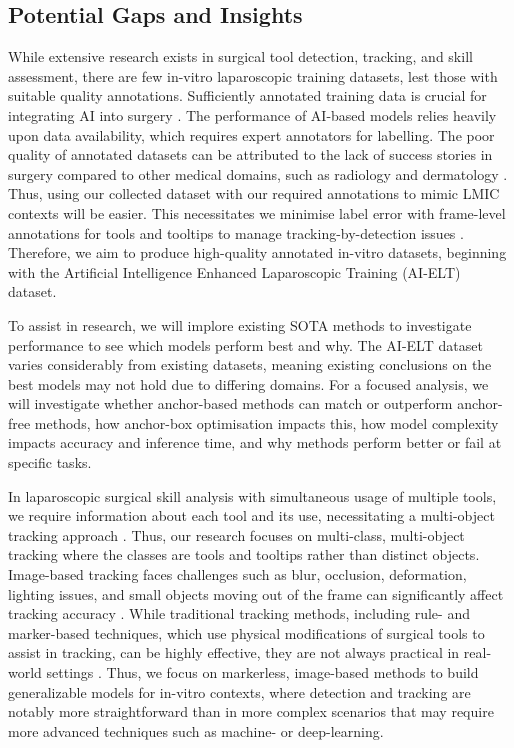 \subsection{Potential Gaps and Insights}

While extensive research exists in surgical tool detection, tracking, and skill assessment, there are few in-vitro laparoscopic training datasets, lest those with suitable quality annotations. Sufficiently annotated training data is crucial for integrating AI into surgery \cite{ali2023comprehensivesurveyrecentdeep}. The performance of AI-based models relies heavily upon data availability, which requires expert annotators for labelling. The poor quality of annotated datasets can be attributed to the lack of success stories in surgery compared to other medical domains, such as radiology and dermatology \cite{maier-hein_surgical_2022}. Thus, using our collected dataset with our required annotations to mimic LMIC contexts will be easier. This necessitates we minimise label error with frame-level annotations for tools and tooltips to manage tracking-by-detection issues \cite{teevno_semi-supervised_2023}. Therefore, we aim to produce high-quality annotated in-vitro datasets, beginning with the Artificial Intelligence Enhanced Laparoscopic Training (AI-ELT) dataset. 

To assist in research, we will implore existing SOTA methods to investigate performance to see which models perform best and why. The AI-ELT dataset varies considerably from existing datasets, meaning existing conclusions on the best models may not hold due to differing domains. For a focused analysis, we will investigate whether anchor-based methods can match or outperform anchor-free methods, how anchor-box optimisation impacts this, how model complexity impacts accuracy and inference time, and why methods perform better or fail at specific tasks. 

In laparoscopic surgical skill analysis with simultaneous usage of multiple tools, we require information about each tool and its use, necessitating a multi-object tracking approach \cite{yang_image-based_2020}. Thus, our research focuses on multi-class, multi-object tracking where the classes are tools and tooltips rather than distinct objects. Image-based tracking faces challenges such as blur, occlusion, deformation, lighting issues, and small objects moving out of the frame can significantly affect tracking accuracy \cite{ourselin_real-time_2016, magro_dual-instrument_2024, SurgiTrack}. While traditional tracking methods, including rule- and marker-based techniques, which use physical modifications of surgical tools to assist in tracking, can be highly effective, they are not always practical in real-world settings \cite{bodenstedt_comparative_2018}. Thus, we focus on markerless, image-based methods to build generalizable models for in-vitro contexts, where detection and tracking are notably more straightforward than in more complex scenarios that may require more advanced techniques such as machine- or deep-learning.

